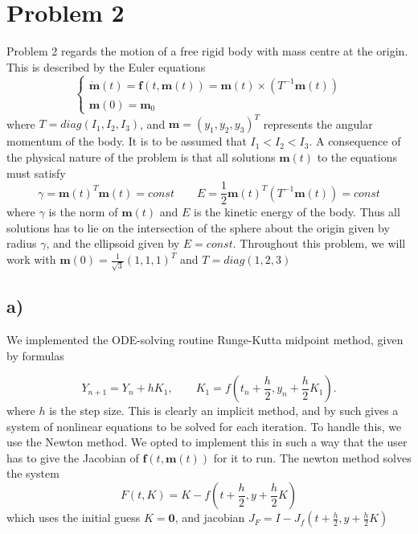 \documentclass[12pt, a4paper,usenames,dvipsnames]{article}
\renewcommand\vec{\mathbf}
\begin{document}
\section*{Problem 2}
Problem 2 regards the motion of a free rigid body with mass centre at the origin. This is described by the Euler equations
\[\left\{\begin{array}{l}
    \dot{ \vec{m}}(t)=\vec{f}(t,\vec{m}(t))=\vec{m}(t)\times({T^{-1}}\vec{m}(t))   \\
    \vec{m}(0)=\vec{m}_0  
\end{array}\right.\]
where \(T=diag(I_1,I_2,I_3)\), and \(\vec{m}=(y_1,y_2,y_3)^T\) represents the angular momentum of the body. It is to be assumed that \(I_1<I_2<I_3\). A consequence of the physical nature of the problem is that all solutions \(\vec{m}(t)\) to the equations must satisfy 
\[\gamma=\vec{m}(t)^T\vec{m}(t)=const\qquad E=\frac{1}{2}\vec{m}(t)^T(T^{-1}\vec{m}(t))=const\]
where \(\gamma\) is the norm of \(\vec{m}(t)\) and \(E\) is the kinetic energy of the body. Thus all solutions has to lie on the intersection of the sphere about the origin given by radius \(\gamma\), and the ellipsoid given by \(E=const\). Throughout this problem, we will work with \(\vec{m}(0)=\frac{1}{\sqrt{3}}(1,1,1)^T\) and \(T=diag(1,2,3)\)
\subsection*{a)}
We implemented the ODE-solving routine Runge-Kutta midpoint method, given by formulas

\[Y_{n+1} = Y_n +  hK_1, \qquad K_1=f(t_n + \frac{h}{2}, y_n+\frac{h}{2}K_1).\]
where \(h\) is the step size. This is clearly an implicit method, and by such gives a system of nonlinear equations to be solved for each iteration. To handle this, we use the Newton method. We opted to implement this in such a way that the user has to give the Jacobian of \(\vec{f}(t,\vec{m}(t))\) for it to run. The newton method solves the system
\[F(t,K)=K-f(t+\frac{h}{2},y+\frac{h}{2}K)\]
which uses the initial guess \(K=\vec{0}\), and jacobian \(J_F=I-J_f(t+\frac{h}{2},y+\frac{h}{2}K)\)
\end{document}
